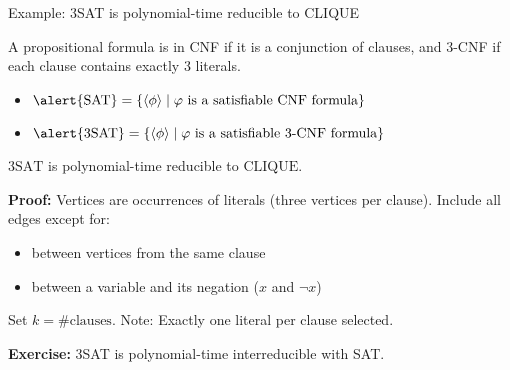 \documentclass[handout]{beamer}
\begin{document}
\begin{frame}{Example: 3SAT is polynomial-time reducible to CLIQUE}
    
    A propositional formula is in \alert{CNF} if it is a conjunction of clauses, and \alert{3-CNF} if each clause contains exactly 3 literals.

    \begin{itemize}
        \item $\alert{\mathrm{SAT}}=\{\langle\phi\rangle\mid \varphi\text{ is a satisfiable CNF formula}\}$
        \item $\alert{\mathrm{3SAT}}=\{\langle\phi\rangle\mid \varphi\text{ is a satisfiable 3-CNF formula}\}$
    \end{itemize}
    
    \begin{theorem}
        $\mathrm{3SAT}$ is polynomial-time reducible to $\mathrm{CLIQUE}$.
    \end{theorem}
    \textbf{Proof:} Vertices are occurrences of literals (three vertices per clause). Include all edges except for:
    \begin{itemize}
        \item between vertices from the same clause
        \item between a variable and its negation ($x$ and $\neg x$)
    \end{itemize}
    Set $k=\#\text{clauses}$. Note: Exactly one literal per clause selected.\hfill\qedsymbol

    \textbf{Exercise:} 3SAT is polynomial-time interreducible with SAT.

\end{frame}
\end{document}
